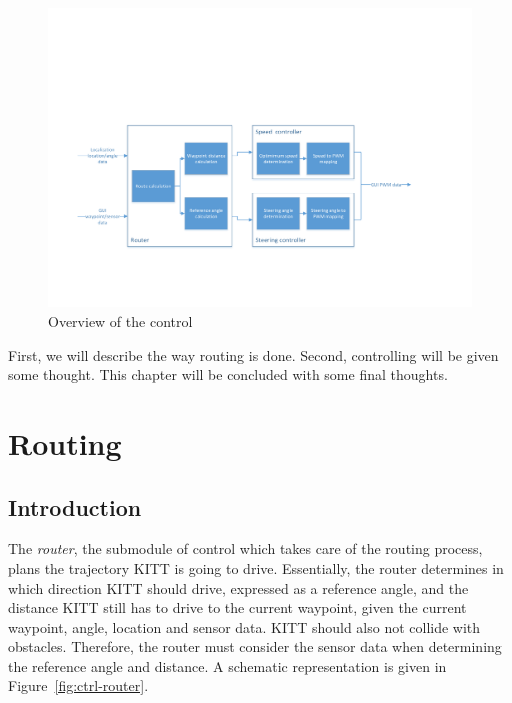 \documentclass[11pt,titlepage]{report}
\begin{document}
\begin{figure}[H]
	\begin{center}
		\includegraphics[width=\linewidth]{resource/control-overview.pdf}
	\end{center}
	\caption{Overview of the control}
	\label{fig:ctrl-overview}
\end{figure}

First, we will describe the way routing is done. Second, controlling will be given some thought. This chapter will be concluded with some final thoughts.

\section{Routing}
\subsection{Introduction}
The \textit{router}, the submodule of control which takes care of the routing process, plans the trajectory KITT is going to drive. Essentially, the router determines in which direction KITT should drive, expressed as a reference angle, and the distance KITT still has to drive to the current waypoint, given the current waypoint, angle, location and sensor data. KITT should also not collide with obstacles. Therefore, the router must consider the sensor data when determining the reference angle and distance. A schematic representation is given in Figure~\ref{fig:ctrl-router}.
\end{document}
